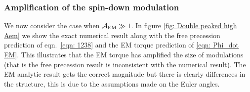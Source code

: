 \documentclass[/home/greg/Thesis/main/main.tex]{subfiles}
\begin{document}

\subsubsection{Amplification of the spin-down modulation}

We now consider the case when $\mathcal{A}_{\mathrm{EM}} \gg 1$. In figure \ref{fig: Double peaked
high Aem} we show the exact numerical result along with the free precession
prediction of eqn.~\eqref{eqn: 1238} and the EM torque prediction of
\eqref{eqn: Phi_dot EM}. This illustrates that the EM torque has amplified
the size of modulations (that is the free precession result is inconsistent
with the numerical result). The EM analytic result gets the correct magnitude
but there is clearly differences in the structure, this is due to the assumptions
made on the Euler angles.



\biblio
\end{document}
